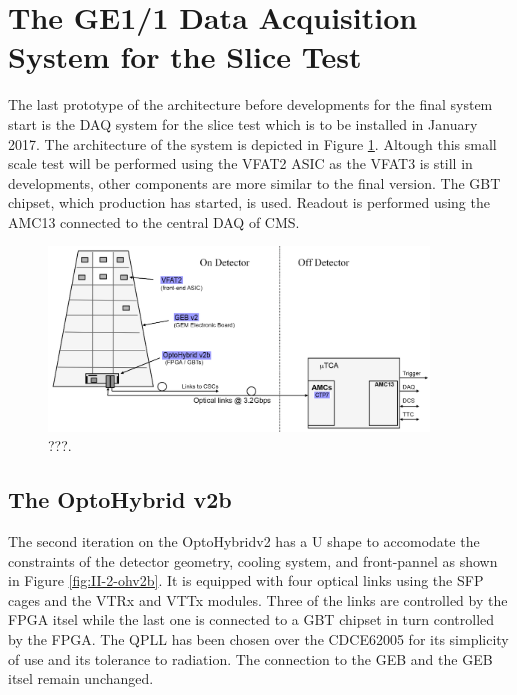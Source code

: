   \section{The GE1/1 Data Acquisition System for the Slice Test}

    The last prototype of the architecture before developments for the final system start is the DAQ system for the slice test which is to be installed in January 2017. The architecture of the system is depicted in Figure \ref{fig:II-2-gem-system-v2b}. Altough this small scale test will be performed using the VFAT2 ASIC as the VFAT3 is still in developments, other components are more similar to the final version. The GBT chipset, which production has started, is used. Readout is performed using the AMC13 connected to the central DAQ of CMS.

    \begin{figure}[h!]
      \centering
      \includegraphics[width=0.9\textwidth]{img/II-2-daq/gem-system-v2b.pdf}
      \caption{???.}
      \label{fig:II-2-gem-system-v2b}
    \end{figure}

    \subsection{The OptoHybrid v2b}

      The second iteration on the OptoHybridv2 has a U shape to accomodate the constraints of the detector geometry, cooling system, and front-pannel as shown in Figure \ref{fig:II-2-ohv2b}. It is equipped with four optical links using the SFP cages and the VTRx and VTTx modules. Three of the links are controlled by the FPGA itsel while the last one is connected to a GBT chipset in turn controlled by the FPGA. The QPLL has been chosen over the CDCE62005 for its simplicity of use and its tolerance to radiation. The connection to the GEB and the GEB itsel remain unchanged.

